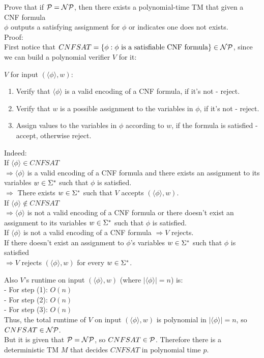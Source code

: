 Prove that if $\mathcal{P} = \mathcal{N}\mathcal{P}$, then there exists a polynomial-time TM that given a CNF formula \\
$\phi$ outputs a satisfying assignment for $\phi$ or indicates one does not exists. \\

Proof: \\
First notice that $CNFSAT = \{\phi: \phi \text{ is a satisfiable CNF formula}\} \in \mathcal{N}\mathcal{P}$,
since we can build a polynomial verifier $V$ for it:

$V$ for input $(\langle \phi \rangle, w)$:
\begin{enumerate}[1., itemsep=5pt]
    \item Verify that $\langle \phi \rangle$ is a valid encoding of a CNF formula, if it's not - reject.

    \item Verify that $w$ is a possible assignment to the variables in $\phi$, if it's not - reject.

    \item Assign values to the variables in $\phi$ according to $w$, if the formula is satisfied - accept, otherwise reject.

\end{enumerate}

Indeed: \\
If $\langle \phi \rangle \in CNFSAT$ \\
$\Rightarrow \langle \phi \rangle$ is a valid encoding of a CNF formula
and there exists an assignment to its variables $w \in \Sigma^*$ such that $\phi$ is satisfied. \\
$\Rightarrow $ There exists $w \in \Sigma^*$ such that $V$ accepts $(\langle \phi \rangle, w)$. \\

If $\langle \phi \rangle \notin CNFSAT$ \\
$\Rightarrow \langle \phi \rangle$ is not a valid encoding of a CNF formula
or there doesn't exist an assignment to its variables $w \in \Sigma^*$ such that $\phi$ is satisfied. \\
If $\langle \phi \rangle$ is not a valid encoding of a CNF formula $\Rightarrow V$ rejects. \\
If there doesn't exist an assignment to $\phi$'s variables $w \in \Sigma^*$ such that $\phi$ is satisfied \\
$\Rightarrow V$ rejects $(\langle \phi \rangle, w)$ for every $w \in \Sigma^*$.

Also $V$'s runtime on input $(\langle \phi \rangle, w)$ (where $|\langle \phi \rangle|=n$) is: \\
- For step (1): $O(n)$ \\
- For step (2): $O(n)$ \\
- For step (3): $O(n)$ \\
Thus, the total runtime of $V$ on input  $(\langle \phi \rangle, w)$ is polynomial in $|\langle \phi \rangle|=n$, so $CNFSAT \in \mathcal{N}\mathcal{P}$. \\
But it is given that $\mathcal{P} = \mathcal{N}\mathcal{P}$, so $CNFSAT \in \mathcal{P}$.
Therefore there is a deterministic TM $M$ that decides $CNFSAT$ in polynomial time $p$. \\

